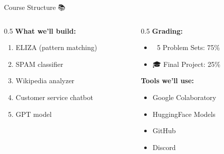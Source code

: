 \documentclass[aspectratio=169]{beamer}
\begin{document}
\begin{frame}[shrink=10]{Course Structure 📚}
\begin{columns}
\begin{column}{0.5\textwidth}
\textbf{What we'll build:}
\begin{enumerate}\setlength{\itemsep}{0pt}
    \item ELIZA (pattern matching)
    \item SPAM classifier
    \item Wikipedia analyzer
    \item Customer service chatbot
    \item GPT model
\end{enumerate}
\end{column}

\begin{column}{0.5\textwidth}
\textbf{Grading:}
\begin{itemize}\setlength{\itemsep}{0pt}
    \item 📝 5 Problem Sets: 75\%
    \item 🎓 Final Project: 25\%
\end{itemize}

\vspace{0.15cm}

\textbf{Tools we'll use:}
\begin{itemize}\setlength{\itemsep}{0pt}
    \item Google Colaboratory
    \item HuggingFace Models
    \item GitHub
    \item Discord
\end{itemize}
\end{column}
\end{columns}
\end{frame}
\end{document}
